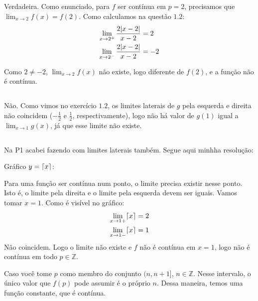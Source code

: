 \documentclass[12pt]{article}
\DeclarePairedDelimiter{\ceil}{\lceil}{\rceil}
\theoremstyle{definition}
\begin{document}
\subsection{}
Verdadeira. Como enunciado, para \(f\) ser contínua em \(p=2\), precisamos que \(\lim_{x \rightarrow 2}f(x) = f(2)\). Como calculamos na questão \(1.2\):
\begin{align*}
	\lim_{x\rightarrow2^+} \frac{2\abs{x-2}}{x-2} &= 2 \\
	\lim_{x\rightarrow2^-} \frac{2\abs{x-2}}{x-2} &= -2
\end{align*}

Como \(2 \ne -2\), \(\lim_{x\rightarrow 2} f(x)\) não existe, logo diferente de \(f(2)\), e a função não é contínua.

\subsection{}
Não. Como vimos no exercício \(1.2\), os limites laterais de \(g\) pela esquerda e direita não coincidem (\(-\frac{1}{2}\) e \(\frac{1}{2}\), respectivamente), logo não há valor de \(g(1)\) igual a \(\lim_{x\rightarrow 1}g(x)\), já que esse limite não existe.

\subsection{}
Na P1 acabei fazendo com limites laterais também. Segue aqui minhha resolução:

Gráfico \(y = \ceil{x}\):


Para uma função ser contínua num ponto, o limite precisa existir nesse ponto. Isto é, o limite pela direita e o limite pela esquerda devem ser iguais. Vamos tomar \(x=1\). Como é visível no gráfico:
\begin{align*}
	\lim_{x\rightarrow 1+} \ceil{x} &= 2 \\
	\lim_{x\rightarrow 1-} \ceil{x}  &= 1
\end{align*}
Não coincidem. Logo o limite não existe e \(f\) não é contínua em \(x=1\), logo não é contínua em todo \(p \in \mathbb{Z}\).

Caso você tome \(p\) como membro do conjunto \((n, n+1]\), \(n \in \mathbb{Z}\). Nesse intervalo, o único valor que \(f(p)\) pode assumir é o próprio \(n\). Dessa maneira, temos uma função constante, que é contínua.
\end{document}
